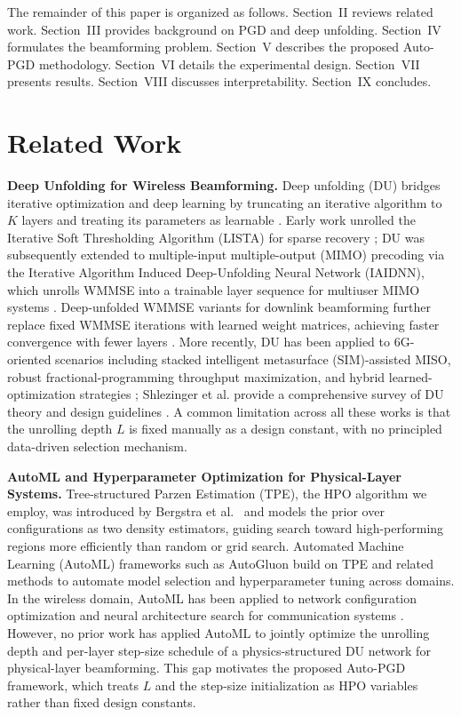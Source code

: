 \documentclass[conference,11pt]{IEEEtran}
\begin{document}
The remainder of this paper is organized as follows. Section~II reviews related work. Section~III provides background on PGD and deep unfolding. Section~IV formulates the beamforming problem. Section~V describes the proposed Auto-PGD methodology. Section~VI details the experimental design. Section~VII presents results. Section~VIII discusses interpretability. Section~IX concludes.

\section{Related Work}

\textbf{Deep Unfolding for Wireless Beamforming.}
Deep unfolding (DU) bridges iterative optimization and deep learning by truncating an iterative algorithm to $K$ layers and treating its parameters as learnable \cite{balatsoukas2019deepunfolding}. Early work unrolled the Iterative Soft Thresholding Algorithm (LISTA) for sparse recovery \cite{gregor2010lista}; DU was subsequently extended to multiple-input multiple-output (MIMO) precoding via the Iterative Algorithm Induced Deep-Unfolding Neural Network (IAIDNN), which unrolls WMMSE into a trainable layer sequence for multiuser MIMO systems \cite{hu2020deepunfolding}. Deep-unfolded WMMSE variants for downlink beamforming further replace fixed WMMSE iterations with learned weight matrices, achieving faster convergence with fewer layers \cite{pellaco2021deep}. More recently, DU has been applied to 6G-oriented scenarios including stacked intelligent metasurface (SIM)-assisted MISO, robust fractional-programming throughput maximization, and hybrid learned-optimization strategies \cite{ibrahim2026deepunfolding,bui2026deepunfolded,zhu2026deepfp}; Shlezinger et al. provide a comprehensive survey of DU theory and design guidelines \cite{shlezinger2025deepunfolding}. A common limitation across all these works is that the unrolling depth $L$ is fixed manually as a design constant, with no principled data-driven selection mechanism.

\textbf{AutoML and Hyperparameter Optimization for Physical-Layer Systems.}
Tree-structured Parzen Estimation (TPE), the HPO algorithm we employ, was introduced by Bergstra et al.~\cite{bergstra2011tpe} and models the prior over configurations as two density estimators, guiding search toward high-performing regions more efficiently than random or grid search. Automated Machine Learning (AutoML) frameworks such as AutoGluon \cite{erickson2020autogluon} build on TPE and related methods to automate model selection and hyperparameter tuning across domains. In the wireless domain, AutoML has been applied to network configuration optimization \cite{filippou2023automl} and neural architecture search for communication systems \cite{wang2024nas}. However, no prior work has applied AutoML to jointly optimize the unrolling depth and per-layer step-size schedule of a physics-structured DU network for physical-layer beamforming. This gap motivates the proposed Auto-PGD framework, which treats $L$ and the step-size initialization as HPO variables rather than fixed design constants.
\end{document}
